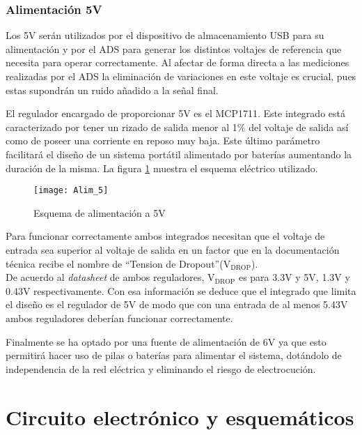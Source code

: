 \subsubsection{Alimentación 5V\label{sec:Alimentacion_5V}}

Los 5V serán utilizados por el dispositivo de almacenamiento USB para su alimentación y por el ADS para generar los distintos voltajes de referencia que necesita para operar correctamente. Al afectar de forma directa a las mediciones realizadas por el ADS la eliminación de variaciones en este voltaje es crucial, pues estas supondrán un ruido añadido a la señal final.

El regulador encargado de proporcionar 5V es el MCP1711. Este integrado está caracterizado por tener un rizado de salida menor al 1\% del voltaje de salida así como de poseer una corriente en reposo muy baja. Este último parámetro facilitará el diseño de un sistema portátil alimentado por baterías aumentando la duración de la misma. La figura \ref{fig:Alim_5} muestra el esquema eléctrico utilizado.

\begin{figure} [h]
    \centering
    \texttt{[image: Alim\_5]}
    \caption{Esquema de alimentación a 5V}
    \label{fig:Alim_5}
\end{figure}

Para funcionar correctamente ambos integrados necesitan que el voltaje de entrada sea superior al voltaje de salida en un factor que en la documentación técnica recibe el nombre de ``\gls{Tension de Dropout}''(V$_{\text{DROP}}$).
\\De acuerdo al \textit{datasheet} de ambos reguladores, V$_{\text{DROP}}$ es para 3.3V y 5V, 1.3V y 0.43V respectivamente. Con esa información se deduce que el integrado que limita el diseño es el regulador de 5V de modo que con una entrada de al menos 5.43V ambos reguladores deberían funcionar correctamente.

Finalmente se ha optado por una fuente de alimentación de 6V ya que esto permitirá hacer uso de pilas o baterías para alimentar el sistema, dotándolo de independencia de la red eléctrica y eliminando el riesgo de electrocución.

\clearpage

\section{Circuito electrónico y esquemáticos\label{sec:Esquemáticos}}


